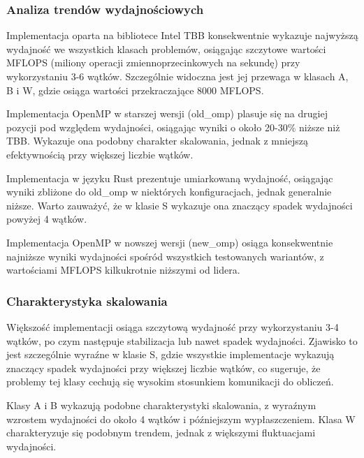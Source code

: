 \subsubsection{Analiza trendów wydajnościowych}
Implementacja oparta na bibliotece Intel TBB konsekwentnie wykazuje najwyższą wydajność we wszystkich klasach problemów, osiągając szczytowe wartości MFLOPS (miliony operacji zmiennoprzecinkowych na sekundę) przy wykorzystaniu 3-6 wątków. Szczególnie widoczna jest jej przewaga w klasach A, B i W, gdzie osiąga wartości przekraczające 8000 MFLOPS.

Implementacja OpenMP w starszej wersji (old\_omp) plasuje się na drugiej pozycji pod względem wydajności, osiągając wyniki o około 20-30\% niższe niż TBB. Wykazuje ona podobny charakter skalowania, jednak z mniejszą efektywnością przy większej liczbie wątków.

Implementacja w języku Rust prezentuje umiarkowaną wydajność, osiągając wyniki zbliżone do old\_omp w niektórych konfiguracjach, jednak generalnie niższe. Warto zauważyć, że w klasie S wykazuje ona znaczący spadek wydajności powyżej 4 wątków.

Implementacja OpenMP w nowszej wersji (new\_omp) osiąga konsekwentnie najniższe wyniki wydajności spośród wszystkich testowanych wariantów, z wartościami MFLOPS kilkukrotnie niższymi od lidera.

\subsubsection{Charakterystyka skalowania}
Większość implementacji osiąga szczytową wydajność przy wykorzystaniu 3-4 wątków, po czym następuje stabilizacja lub nawet spadek wydajności. Zjawisko to jest szczególnie wyraźne w klasie S, gdzie wszystkie implementacje wykazują znaczący spadek wydajności przy większej liczbie wątków, co sugeruje, że problemy tej klasy cechują się wysokim stosunkiem komunikacji do obliczeń.

Klasy A i B wykazują podobne charakterystyki skalowania, z wyraźnym wzrostem wydajności do około 4 wątków i późniejszym wypłaszczeniem. Klasa W charakteryzuje się podobnym trendem, jednak z większymi fluktuacjami wydajności.

